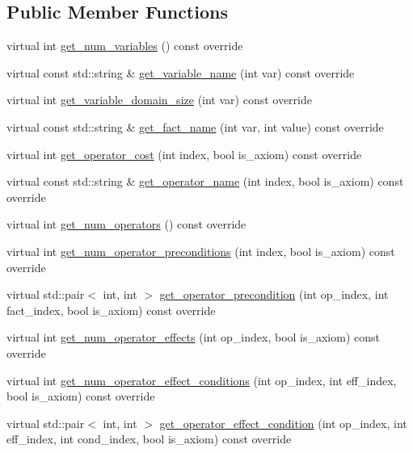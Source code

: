 \subsection*{Public Member Functions}
\begin{DoxyCompactItemize}
\item 
virtual int \hyperlink{classRootTask_a4d49dd1233c035c319071a1977c6d0d4}{get\-\_\-num\-\_\-variables} () const override
\item 
virtual const std\-::string \& \hyperlink{classRootTask_a156cccfcdc7ad59e8792409b0f06ad1d}{get\-\_\-variable\-\_\-name} (int var) const override
\item 
virtual int \hyperlink{classRootTask_a268a95d20e865b066424b6f5a656c60a}{get\-\_\-variable\-\_\-domain\-\_\-size} (int var) const override
\item 
virtual const std\-::string \& \hyperlink{classRootTask_a0e3e99e8c062751f261ec088ebb74a19}{get\-\_\-fact\-\_\-name} (int var, int value) const override
\item 
virtual int \hyperlink{classRootTask_a37a97a51a64ddc05e85d3252c685392a}{get\-\_\-operator\-\_\-cost} (int index, bool is\-\_\-axiom) const override
\item 
virtual const std\-::string \& \hyperlink{classRootTask_adb7ac227f8595146614ab51d89793765}{get\-\_\-operator\-\_\-name} (int index, bool is\-\_\-axiom) const override
\item 
virtual int \hyperlink{classRootTask_a8df251f8be26777be878d309286ce1e7}{get\-\_\-num\-\_\-operators} () const override
\item 
virtual int \hyperlink{classRootTask_ae78ed7674c9071317117cec0f19b026f}{get\-\_\-num\-\_\-operator\-\_\-preconditions} (int index, bool is\-\_\-axiom) const override
\item 
virtual std\-::pair$<$ int, int $>$ \hyperlink{classRootTask_aa9f9d67cc6824ccd7008666bb53262e4}{get\-\_\-operator\-\_\-precondition} (int op\-\_\-index, int fact\-\_\-index, bool is\-\_\-axiom) const override
\item 
virtual int \hyperlink{classRootTask_a74ec7d0968e42fcb0c5847509f518023}{get\-\_\-num\-\_\-operator\-\_\-effects} (int op\-\_\-index, bool is\-\_\-axiom) const override
\item 
virtual int \hyperlink{classRootTask_aec7d32ea79fc430f6d280c74e5264e4d}{get\-\_\-num\-\_\-operator\-\_\-effect\-\_\-conditions} (int op\-\_\-index, int eff\-\_\-index, bool is\-\_\-axiom) const override
\item 
virtual std\-::pair$<$ int, int $>$ \hyperlink{classRootTask_aa37d8174fe1d2e62642502e7483b88b2}{get\-\_\-operator\-\_\-effect\-\_\-condition} (int op\-\_\-index, int eff\-\_\-index, int cond\-\_\-index, bool is\-\_\-axiom) const override

\end{DoxyCompactItemize}

